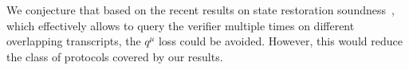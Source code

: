 %


We conjecture that based on the recent results on state restoration soundness~\cite{cryptoeprint:2020:1351}, which effectively allows to query the verifier multiple times on different overlapping transcripts, the $q^{\mu}$ loss could be avoided. However, this would reduce the class of protocols covered by our results. 

